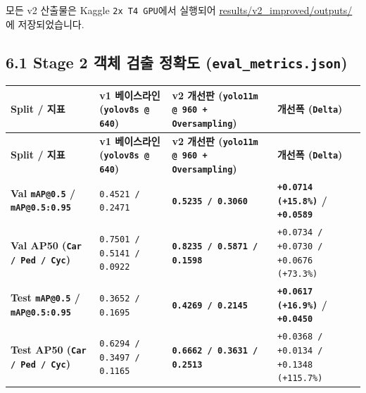 \documentclass[10.5pt,a4paper]{article}
\begin{document}
모든 v2 산출물은 Kaggle \texttt{2x T4 GPU}에서 실행되어 \href{https://github.com/Heisnotanimposter/Totalcare\_autonomous\_driving\_Yolov5/tree/main/results/v2\_improved/outputs}{results/v2\_improved/outputs/}에 저장되었습니다.


\subsection{6.1 Stage 2 객체 검출 정확도 (\texttt{eval\_\allowbreak{}metrics.\allowbreak{}json})}

\begin{footnotesize}
\setlength{\tabcolsep}{4pt}
\setlength{\LTleft}{0pt}\setlength{\LTright}{0pt}
\begin{longtable}{>{\raggedright\arraybackslash}p{} >{\raggedright\arraybackslash}p{} >{\raggedright\arraybackslash}p{} >{\raggedright\arraybackslash}p{}}
\toprule
\textbf{Split / 지표} & \textbf{v1 베이스라인 (\texttt{yolov8s @ 640})} & \textbf{v2 개선판 (\texttt{yolo11m @ 960 + Oversampling})} & \textbf{개선폭 (\texttt{Delta})} \\
\midrule
\endfirsthead
\toprule
\textbf{Split / 지표} & \textbf{v1 베이스라인 (\texttt{yolov8s @ 640})} & \textbf{v2 개선판 (\texttt{yolo11m @ 960 + Oversampling})} & \textbf{개선폭 (\texttt{Delta})} \\
\midrule
\endhead
\bottomrule
\endfoot
\textbf{Val \texttt{mAP@0.\allowbreak{}5} / \texttt{mAP@0.\allowbreak{}5:\allowbreak{}0.\allowbreak{}95}} & \texttt{0.\allowbreak{}4521 /\allowbreak{} 0.\allowbreak{}2471} & \textbf{\texttt{0.\allowbreak{}5235 /\allowbreak{} 0.\allowbreak{}3060}} & \textbf{\texttt{+0.\allowbreak{}0714 (+15.\allowbreak{}8\%)} / \texttt{+0.\allowbreak{}0589}} \\
\textbf{Val AP50 (\texttt{Car /\allowbreak{} Ped /\allowbreak{} Cyc})} & \texttt{0.\allowbreak{}7501 /\allowbreak{} 0.\allowbreak{}5141 /\allowbreak{} 0.\allowbreak{}0922} & \textbf{\texttt{0.\allowbreak{}8235 /\allowbreak{} 0.\allowbreak{}5871 /\allowbreak{} 0.\allowbreak{}1598}} & \texttt{+0.\allowbreak{}0734 /\allowbreak{} +0.\allowbreak{}0730 /\allowbreak{} +0.\allowbreak{}0676 (+73.\allowbreak{}3\%)} \\
\textbf{Test \texttt{mAP@0.\allowbreak{}5} / \texttt{mAP@0.\allowbreak{}5:\allowbreak{}0.\allowbreak{}95}} & \texttt{0.\allowbreak{}3652 /\allowbreak{} 0.\allowbreak{}1695} & \textbf{\texttt{0.\allowbreak{}4269 /\allowbreak{} 0.\allowbreak{}2145}} & \textbf{\texttt{+0.\allowbreak{}0617 (+16.\allowbreak{}9\%)} / \texttt{+0.\allowbreak{}0450}} \\
\textbf{Test AP50 (\texttt{Car /\allowbreak{} Ped /\allowbreak{} Cyc})} & \texttt{0.\allowbreak{}6294 /\allowbreak{} 0.\allowbreak{}3497 /\allowbreak{} 0.\allowbreak{}1165} & \textbf{\texttt{0.\allowbreak{}6662 /\allowbreak{} 0.\allowbreak{}3631 /\allowbreak{} 0.\allowbreak{}2513}} & \texttt{+0.\allowbreak{}0368 /\allowbreak{} +0.\allowbreak{}0134 /\allowbreak{} +0.\allowbreak{}1348 (+115.\allowbreak{}7\%)} \\
\end{longtable}
\end{footnotesize}
\end{document}
